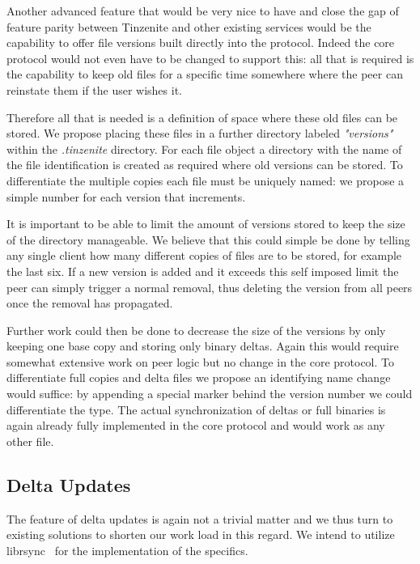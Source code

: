 Another advanced feature that would be very nice to have and close the gap of feature parity between Tinzenite and other existing services would be the capability to offer file versions built directly into the protocol.
Indeed the core protocol would not even have to be changed to support this: all that is required is the capability to keep old files for a specific time somewhere where the peer can reinstate them if the user wishes it.

Therefore all that is needed is a definition of space where these old files can be stored.
We propose placing these files in a further directory labeled \textit{"versions"} within the \textit{.tinzenite} directory.
For each file object a directory with the name of the file identification is created as required where old versions can be stored.
To differentiate the multiple copies each file must be uniquely named: we propose a simple number for each version that increments.

It is important to be able to limit the amount of versions stored to keep the size of the directory manageable.
We believe that this could simple be done by telling any single client how many different copies of files are to be stored, for example the last six.
If a new version is added and it exceeds this self imposed limit the peer can simply trigger a normal removal, thus deleting the version from all peers once the removal has propagated.

Further work could then be done to decrease the size of the versions by only keeping one base copy and storing only binary deltas.
Again this would require somewhat extensive work on peer logic but no change in the core protocol.
To differentiate full copies and delta files we propose an identifying name change would suffice: by appending a special marker behind the version number we could differentiate the type.
The actual synchronization of deltas or full binaries is again already fully implemented in the core protocol and would work as any other file.

\subsection{Delta Updates}
\label{sub:Delta Updates}

The feature of delta updates is again not a trivial matter and we thus turn to existing solutions to shorten our work load in this regard.
We intend to utilize librsync~\cite{web:site:librsync} for the implementation of the specifics.

